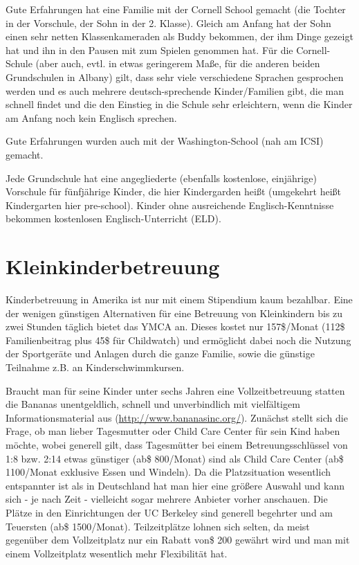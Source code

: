 \documentclass[a4paper]{scrreprt}
\begin{document}
Gute Erfahrungen hat eine Familie mit der Cornell School gemacht (die Tochter in der Vorschule, der Sohn in der 2. Klasse). Gleich am Anfang hat der Sohn einen sehr netten Klassenkameraden als Buddy bekommen, der ihm Dinge gezeigt hat und ihn in den Pausen mit zum Spielen genommen hat. Für die Cornell-Schule (aber auch, evtl. in etwas geringerem Maße, für die anderen beiden Grundschulen in Albany) gilt, dass sehr viele verschiedene Sprachen gesprochen werden und es auch mehrere deutsch-sprechende Kinder/Familien gibt, die man schnell findet und die den Einstieg in die Schule sehr erleichtern, wenn die Kinder am Anfang noch kein Englisch sprechen.

Gute Erfahrungen wurden auch mit der Washington-School (nah am ICSI) gemacht.

Jede Grundschule hat eine angegliederte (ebenfalls kostenlose, einjährige) Vorschule für fünfjährige Kinder, die hier Kindergarden heißt (umgekehrt heißt Kindergarten hier pre-school). Kinder ohne ausreichende Englisch-Kenntnisse bekommen kostenlosen Englisch-Unterricht (ELD).

\section{Kleinkinderbetreuung}

Kinderbetreuung in Amerika ist nur mit einem Stipendium kaum bezahlbar. Eine der wenigen günstigen Alternativen für eine Betreuung von Kleinkindern bis zu zwei Stunden täglich bietet das YMCA an. Dieses kostet nur 157\$/Monat (112\$ Familienbeitrag plus 45\$ für Childwatch) und ermöglicht dabei noch die Nutzung der Sportgeräte und Anlagen durch die ganze Familie, sowie die günstige Teilnahme z.B. an Kinderschwimmkursen.

Braucht man für seine Kinder unter sechs Jahren eine Vollzeitbetreuung statten die Bananas unentgeldlich, schnell und unverbindlich mit vielfältigem Informationsmaterial aus (\url{http://www.bananasinc.org/}). Zunächst stellt sich die Frage, ob man lieber Tagesmutter oder Child Care Center für sein Kind haben möchte, wobei generell gilt, dass Tagesmütter bei einem Betreuungsschlüssel von 1:8 bzw. 2:14 etwas günstiger (ab\$ 800/Monat) sind als Child Care Center (ab\$ 1100/Monat exklusive Essen und Windeln). Da die Platzsituation wesentlich entspannter ist als in Deutschland hat man hier eine größere Auswahl und kann sich - je nach Zeit - vielleicht sogar mehrere Anbieter vorher anschauen. Die Plätze in den Einrichtungen der UC Berkeley sind generell begehrter und am Teuersten (ab\$ 1500/Monat). Teilzeitplätze lohnen sich selten, da meist gegenüber dem Vollzeitplatz nur ein Rabatt von\$ 200 gewährt wird und man mit einem Vollzeitplatz wesentlich mehr Flexibilität hat. 
\end{document}

